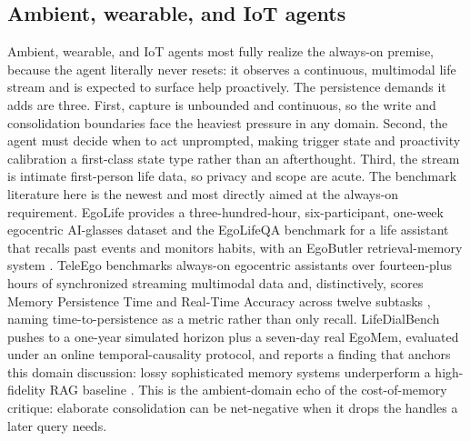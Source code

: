 \subsection{Ambient, wearable, and IoT agents}

Ambient, wearable, and IoT agents most fully realize the always-on premise, because the agent literally never resets: it observes a continuous, multimodal life stream and is expected to surface help proactively. The persistence demands it adds are three. First, capture is unbounded and continuous, so the write and consolidation boundaries face the heaviest pressure in any domain. Second, the agent must decide when to act unprompted, making trigger state and proactivity calibration a first-class state type rather than an afterthought. Third, the stream is intimate first-person life data, so privacy and scope are acute. The benchmark literature here is the newest and most directly aimed at the always-on requirement. EgoLife provides a three-hundred-hour, six-participant, one-week egocentric AI-glasses dataset and the EgoLifeQA benchmark for a life assistant that recalls past events and monitors habits, with an EgoButler retrieval-memory system \citep{yang2025egolife}. TeleEgo benchmarks always-on egocentric assistants over fourteen-plus hours of synchronized streaming multimodal data and, distinctively, scores Memory Persistence Time and Real-Time Accuracy across twelve subtasks \citep{yan2025teleego}, naming time-to-persistence as a metric rather than only recall. LifeDialBench pushes to a one-year simulated horizon plus a seven-day real EgoMem, evaluated under an online temporal-causality protocol, and reports a finding that anchors this domain discussion: lossy sophisticated memory systems underperform a high-fidelity RAG baseline \citep{zheng2026lifedial}. This is the ambient-domain echo of the cost-of-memory critique: elaborate consolidation can be net-negative when it drops the handles a later query needs.

